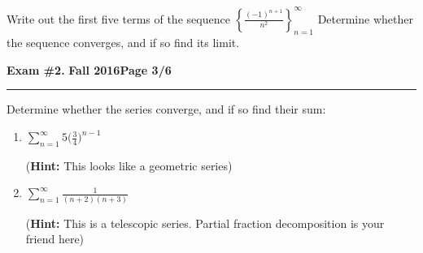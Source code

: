 \documentclass[12pt]{article}
\theoremstyle{definition}
\begin{document}
{ Write out the first five terms of the sequence $\left\{ \displaystyle{\frac{(-1)^{n+1}}{n^2}} \right\}_{n=1}^\infty$ \newline Determine whether the sequence converges, and if so find its limit.
\vspace{7cm}
\begin{flushright}
\end{flushright}
\newpage


\hfill{\large\bf Exam \#2.}\hfill{\large\bf
  Fall 2016}\hfill{\large\bf Page 3/6}\hrule

\bigskip
{  Determine whether the series converge, and if so find their sum:}
\begin{enumerate}
\item $\displaystyle{\sum_{n=1}^\infty 5\Big( \frac{3}{4} \Big)^{n-1}}$ 

(\textbf{Hint:} This looks like a geometric series)
\vspace{7cm}
\begin{flushright}
\end{flushright}
\item $\displaystyle{\sum_{n=1}^\infty \frac{1}{(n+2)(n+3)}}$

(\textbf{Hint:} This is a telescopic series. Partial fraction decomposition is your friend here)
\vspace{7cm}
\begin{flushright}
\end{flushright}
\end{enumerate}
\newpage

}
\end{document}
